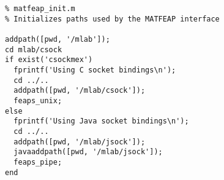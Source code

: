 \begin{verbatim}
% matfeap_init.m
% Initializes paths used by the MATFEAP interface

addpath([pwd, '/mlab']);
cd mlab/csock
if exist('csockmex')
  fprintf('Using C socket bindings\n');
  cd ../..
  addpath([pwd, '/mlab/csock']);
  feaps_unix;
else
  fprintf('Using Java socket bindings\n');
  cd ../..
  addpath([pwd, '/mlab/jsock']);
  javaaddpath([pwd, '/mlab/jsock']);
  feaps_pipe;
end
\end{verbatim}
